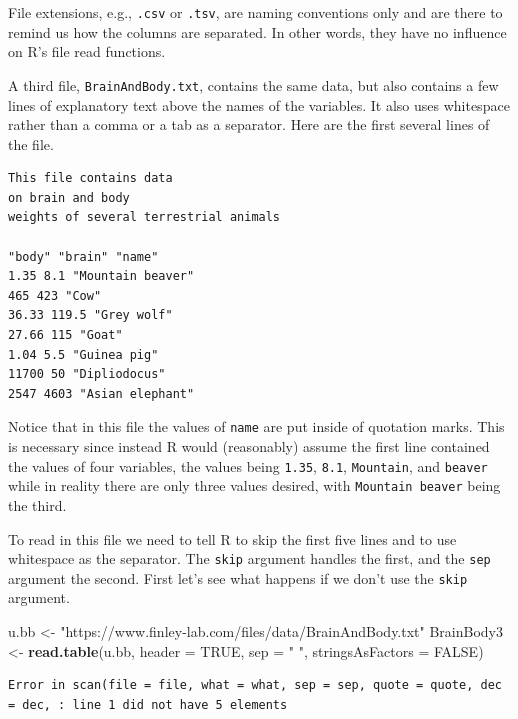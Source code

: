 \documentclass[
]{krantz}
\makeatletter
\newenvironment{Shaded}{\begin{snugshade}}{\end{snugshade}}
\newcommand{\DataTypeTok}[1]{\textcolor[rgb]{0.27,0.27,0.27}{#1}}
\newcommand{\KeywordTok}[1]{\textcolor[rgb]{0.27,0.27,0.27}{\textbf{#1}}}
\newcommand{\NormalTok}[1]{#1}
\newcommand{\OtherTok}[1]{\textcolor[rgb]{0.37,0.37,0.37}{#1}}
\newcommand{\StringTok}[1]{\textcolor[rgb]{0.5,0.5,0.5}{#1}}
\newenvironment{kframe}{%
\medskip{}
\setlength{\fboxsep}{.8em}
 \def\at@end@of@kframe{}%
 \ifinner\ifhmode%
  \def\at@end@of@kframe{\end{minipage}}%
  \begin{minipage}{\columnwidth}%
 \fi\fi%
 \def\FrameCommand##1{\hskip\@totalleftmargin \hskip-\fboxsep
 \colorbox{shadecolor}{##1}\hskip-\fboxsep
     \hskip-\linewidth \hskip-\@totalleftmargin \hskip\columnwidth}%
 \MakeFramed {\advance\hsize-\width
   \@totalleftmargin\z@ \linewidth\hsize
   \@setminipage}}%
 {\par\unskip\endMakeFramed%
 \at@end@of@kframe}
\renewenvironment{Shaded}{\begin{kframe}}{\end{kframe}}
\makeatother
\begin{document}
File extensions, e.g., \texttt{.csv} or \texttt{.tsv}, are naming conventions only and are there to remind us how the columns are separated. In other words, they have no influence on R's file read functions.

A third file, \texttt{BrainAndBody.txt}, contains the same data, but also contains a few lines of explanatory text above the names of the variables. It also uses whitespace rather than a comma or a tab as a separator. Here are the first several lines of the file.

\begin{verbatim}
This file contains data
on brain and body
weights of several terrestrial animals

"body" "brain" "name"
1.35 8.1 "Mountain beaver"
465 423 "Cow"
36.33 119.5 "Grey wolf"
27.66 115 "Goat"
1.04 5.5 "Guinea pig"
11700 50 "Dipliodocus"
2547 4603 "Asian elephant"
\end{verbatim}

Notice that in this file the values of \texttt{name} are put inside of quotation marks. This is necessary since instead R would (reasonably) assume the first line contained the values of four variables, the values being \texttt{1.35}, \texttt{8.1}, \texttt{Mountain}, and \texttt{beaver} while in reality there are only three values desired, with \texttt{Mountain\ beaver} being the third.

To read in this file we need to tell R to skip the first five lines and to use whitespace as the separator. The \texttt{skip} argument handles the first, and the \texttt{sep} argument the second. First let's see what happens if we don't use the \texttt{skip} argument.

\begin{Shaded}
\begin{Highlighting}[]
\NormalTok{u.bb \textless{}{-}}\StringTok{ "https://www.finley{-}lab.com/files/data/BrainAndBody.txt"}
\NormalTok{BrainBody3 \textless{}{-}}\StringTok{ }\KeywordTok{read.table}\NormalTok{(u.bb, }\DataTypeTok{header =} \OtherTok{TRUE}\NormalTok{, }\DataTypeTok{sep =} \StringTok{" "}\NormalTok{, }
                         \DataTypeTok{stringsAsFactors =} \OtherTok{FALSE}\NormalTok{)}
\end{Highlighting}
\end{Shaded}

\begin{verbatim}
Error in scan(file = file, what = what, sep = sep, quote = quote, dec = dec, : line 1 did not have 5 elements
\end{verbatim}
\end{document}
